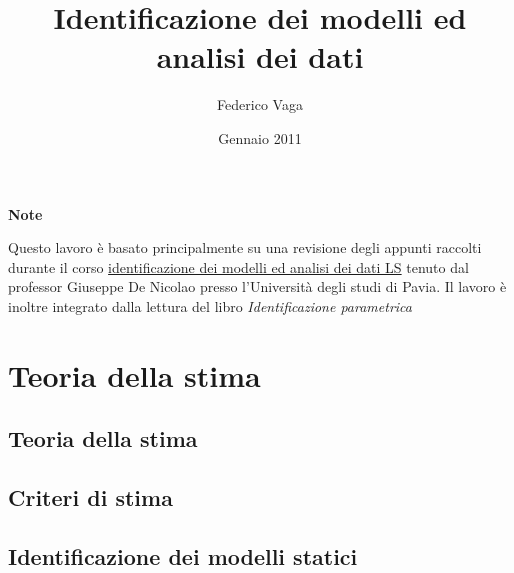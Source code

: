 \documentclass[a4paper,10pt]{book}
\title{Identificazione dei modelli ed analisi dei dati}
\author{Federico Vaga}
\date{Gennaio 2011}
\begin{document}
\maketitle  %


\begin{center}
\textbf{Note}
\end{center}
Questo lavoro è basato principalmente su una revisione degli appunti \cite{unpub:imadls} raccolti durante il corso \href{http://www-3.unipv.it/ingegneria/didattica/schedacorso1011.php?cod=064050&spec=0}{identificazione dei modelli ed analisi dei dati LS} tenuto dal professor Giuseppe De Nicolao presso l'Università degli studi di Pavia. Il lavoro è inoltre integrato dalla lettura del libro \textit{Identificazione parametrica} \cite{book:identificazioneparametrica}

\tableofcontents %

\part{Teoria della stima}
\chapter{Teoria della stima}
  
  
  

\chapter{Criteri di stima}
  
  
  

\chapter{Identificazione dei modelli statici}
  
  
  
  
  
  
  
\end{document}
